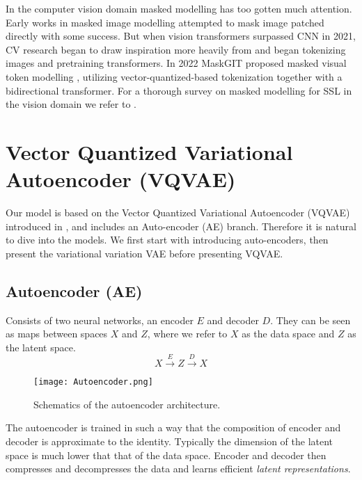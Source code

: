 \documentclass[../../thesis.tex]{subfiles}
\begin{document}
In the computer vision domain masked modelling has too gotten much attention. Early works in masked image modelling \cite{he2021masked} attempted to mask image patched directly with some success. But when vision transformers \cite{dosovitskiy2021image} surpassed CNN in 2021\cite{he2015deep}, CV research began to draw inspiration more heavily from \cite{devlin2019bert} and began tokenizing images and pretraining transformers. In 2022 MaskGIT\cite{chang2022maskgit} proposed masked visual token modelling , utilizing vector-quantized-based tokenization together with a bidirectional transformer. For a thorough survey on masked modelling for SSL in the vision domain we refer to \cite{li2024masked}. 

\section{Vector Quantized Variational Autoencoder (VQVAE)}
\label{section:VQVAE}
Our model is based on the Vector Quantized Variational Autoencoder (VQVAE) introduced in \cite{VQVAE}, and includes an Auto-encoder (AE) branch. Therefore it is natural to dive into the models. We first start with introducing auto-encoders, then present the variational variation VAE before presenting VQVAE. 

\subsection{Autoencoder (AE)}

Consists of two neural networks, an encoder $E$ and decoder $D$. They can be seen as maps between spaces $X$ and $Z$, where we refer to $X$ as the data space and $Z$ as the latent space. 
\begin{equation}
    X \xrightarrow{E} Z \xrightarrow{D} X 
\end{equation}

\begin{figure}[h]
    \texttt{[image: Autoencoder.png]}
    \centering
    \caption{Schematics of the autoencoder architecture.}
    \label{fig:autoencoder}
\end{figure}

The autoencoder is trained in such a way that the composition of encoder and decoder is approximate to the identity. Typically the dimension of the latent space is much lower that that of the data space. Encoder and decoder then compresses and decompresses the data and learns efficient \textit{latent representations}. 
\end{document}
